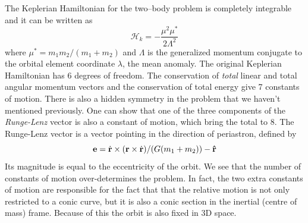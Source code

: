 \documentclass[twoside,openright,titlepage,numbers=noenddot,headinclude,%
                footinclude=true,cleardoublepage=empty,abstractoff, 
                BCOR=5mm,paper=a4,fontsize=11pt,%
                american,%
                ]{scrreprt}%
\begin{document}
The Keplerian Hamiltonian for the two--body problem is completely 
integrable and it can be written as
\begin{equation}
    \mathcal{H}_k=- \frac{\mu^2\mu^*}{2\Lambda^2} 
\end{equation}
where $\mu^*=m_1m_2/(m_1+m_2)$ and $\Lambda$ is the generalized
momentum conjugate to the orbital element coordinate $\lambda$,
the mean anomaly. The original Keplerian Hamiltonian has 6 
degrees of freedom. The conservation of \emph{total} linear and total
angular momentum vectors and the conservation of total energy
give 7 constants of motion. There is also a hidden symmetry in
the problem that we haven't mentioned previously. One can show that
one of the three components of the 
\emph{Runge-Lenz} vector is also a constant of motion, which 
bring the total to 8. The Runge-Lenz vector is a vector pointing
in the direction of periastron, defined by
\begin{equation}
    \boldsymbol{\mathbf{e}}=\dot{\boldsymbol{\mathbf{r}}}\times(\boldsymbol{\mathbf{r}}\times\dot{\boldsymbol{\mathbf{r}}})
    /(G(m_1+m_2)) - \boldsymbol{\mathbf{\hat r}}
\end{equation}
Its magnitude is equal to the eccentricity of the orbit. We 
see that the number of constants of motion over-determines the 
problem. In fact, the two extra constants of motion are responsible
for the fact that that the relative motion is not only restricted to 
a conic curve, but it is also a conic section in the inertial
(centre of mass) frame. Because of this the orbit is also fixed in
3D space.
\end{document}
